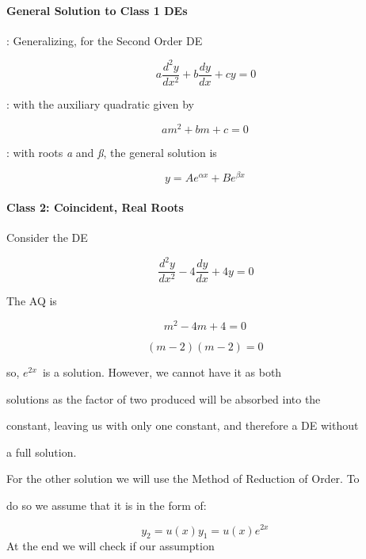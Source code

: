 \paragraph{General Solution to Class 1 DEs}



:   Generalizing, for the Second Order DE



$$a\frac{d^2y}{dx^2}+b\frac{dy}{dx}+cy=0$$



:   with the auxiliary quadratic given by



$$am^2+bm+c=0 \,$$



:   with roots \textit{a} and \textit{ß}, the general solution is



$$y=Ae^{\alpha x}+Be^{\beta x} \,$$



\paragraph{Class 2: Coincident, Real Roots}



Consider the DE



$$\frac{d^2y}{dx^2}-4\frac{dy}{dx}+4y=0$$



The AQ is



$$m^2-4m+4=0 \,$$



$$(m-2)(m-2)=0 \,$$



so, $e^{2x}\,$ is a solution. However, we cannot have it as both

solutions as the factor of two produced will be absorbed into the

constant, leaving us with only one constant, and therefore a DE without

a full solution.



For the other solution we will use the Method of Reduction of Order. To

do so we assume that it is in the form of:



$$y_2=u(x)y_1=u(x)e^{2x}\,$$ At the end we will check if our assumption

